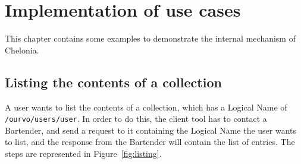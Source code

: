 \documentclass{book}
\begin{document}



\chapter{Implementation of use cases} %
\label{cha:use_cases}

This chapter contains some examples to demonstrate the internal mechanism of Chelonia.

\section{Listing the contents of a collection} %
\label{sec:listing_the_contents_of_a_collection}
\begin{figure}[ht]
\end{figure}

A user wants to list the contents of a collection, which has a Logical Name of \verb!/ourvo/users/user!. In order to do this, the client tool has to contact a Bartender, and send a request to it containing the Logical Name the user wants to list, and the response from the Bartender will contain the list of entries. The steps are represented in Figure~\ref{fig:listing}.
\end{document}
